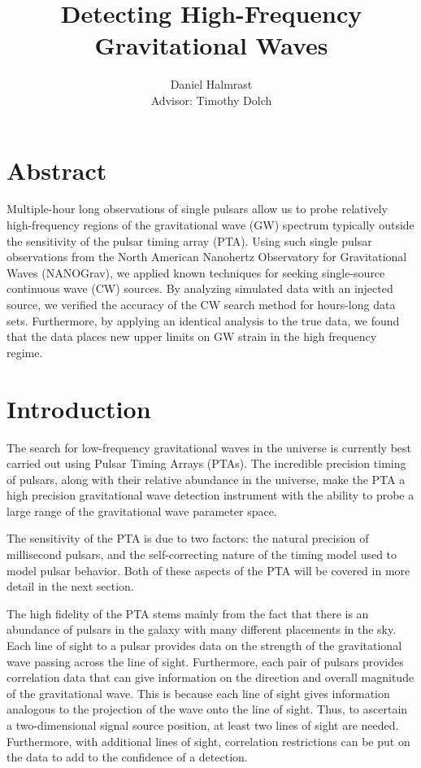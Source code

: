 \documentclass[12pt]{article}
\begin{document}
\bigskip

\title{Detecting High-Frequency Gravitational Waves}
\author{Daniel Halmrast \\ Advisor: Timothy Dolch}

\maketitle

\section{Abstract}
Multiple-hour long observations of single pulsars allow us to probe relatively
high-frequency regions of the gravitational wave (GW) spectrum typically outside
the sensitivity of the pulsar timing array (PTA). Using such single pulsar
observations from the North American Nanohertz Observatory for Gravitational
Waves (NANOGrav), we applied known techniques for seeking single-source continuous
wave (CW) sources. By analyzing simulated data with an injected source, we
verified the accuracy of the CW search method for hours-long data sets.
Furthermore, by applying an identical analysis to the true data, we found that
the data places new upper limits on GW strain in the high frequency regime.

\section{Introduction}
The search for low-frequency gravitational waves in the universe is currently
best carried out using Pulsar Timing Arrays (PTAs). The incredible precision timing of
pulsars, along with their relative abundance in the universe, make the PTA a
high precision gravitational wave detection instrument with the ability to probe
a large range of the gravitational wave parameter space.

The sensitivity of the PTA is due to two factors: the natural precision of
millisecond pulsars, and the self-correcting nature of the timing model used to
model pulsar behavior. Both of these aspects of the PTA will be covered in more
detail in the next section.

The high fidelity of the PTA stems mainly from the fact that there is an
abundance of pulsars in the galaxy with many different placements in the sky.
Each line of sight to a pulsar provides data on the strength of the
gravitational wave passing across the line of sight. Furthermore, each pair of
pulsars provides correlation data that can give information on the direction and
overall magnitude of the gravitational wave. This is because each line of sight
gives information analogous to the projection of the wave onto the line of
sight. Thus, to ascertain a two-dimensional signal source position, at least two
lines of sight are needed. Furthermore, with additional lines of sight,
correlation restrictions can be put on the data to add to the confidence of a
detection.
\end{document}
